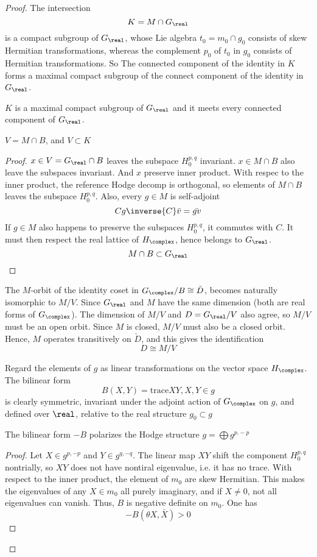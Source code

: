 \documentclass{article}
\begin{document}
\begin{proof}
The intersection
\[
    K = M \cap G_{\real}
\]
is a compact subgroup of $G_{\real}$, whose Lie algebra $t_0 = m_0\cap g_0$ consists 
of skew Hermitian transformations, whereas the complement $p_0$ of $t_0$ in $g_0$ 
consists of Hermitian transformations. So The connected component of the identity 
in $K$ forms a maximal compact subgroup of the connect component  of the identity in
$G_{\real}$. 

$K$ is a maximal compact subgroup of $G_{\real}$ and it meets every connected 
component of $G_{\real}$.

\begin{lemma}
$V = M \cap B$, and $V \subset K$
\end{lemma}
\begin{proof}
$x \in V = G_{\real}\cap B$ leaves the subspace $H_0^{p,q}$ invariant. $x \in M \cap B$
also leave the subspaces invariant. And $x$ preserve inner product. With respec to the 
inner product, the reference Hodge decomp is orthogonal, so elements of $M\cap B$ leaves
the subspace $H_0^{p,q}$. Also, every $g\in M$ is self-adjoint
\[
    Cg\inverse{C}\bar{v} = \bar{gv}
\]
If $g\in M$ also happens to preserve the subspaces $H_0^{p,q}$, it commutes with $C$.
It must then respect the real lattice of $H_{\complex}$, hence belongs to $G_{\real}$.
\[
    M\cap B \subset G_{\real}
\]
\end{proof}

The $M$-orbit of the identity coset in $G_{\complex}/B \cong \check{D}$, becomes 
naturally isomorphic to $M/V$. Since $G_{\real}$ and $M$ have the same dimension
(both are real forms of $G_{\complex}$). The dimension of $M/V$ and $D = G_{\real}/V$
also agree, so $M/V$ must be an open orbit. Since $M$ is closed, $M/V$ must also be a 
closed orbit. Hence, $M$ operates transitively on $\check{D}$, and this gives the 
identification
\[
    D \cong M/V
\]

Regard the elements of $g$ as linear transformations on the vector space $H_{\complex}$.
The bilinear form
\[
    B(X, Y) = \text{trace}XY, X,Y\in g
\]
is clearly symmetric, invariant under the adjoint action of $G_{\complex}$ on $g$,
and defined over $\real$, relative to the real structure $g_0 \subset g$

\begin{lemma}
The bilinear form $-B$ polarizes the Hodge structure $g = \bigoplus g^{p.-p}$
\end{lemma}
\begin{proof}
Let $X \in g^{p,-p}$ and $Y \in g^{q,-q}$. The linear map $XY$ shift the component
$H_0^{p,q}$ nontrially, so $XY$ does not have nontiral eigenvalue, i.e. it has no trace.
With respect to the inner product, the element of $m_0$ are skew Hermitian. This makes
the eigenvalues of any $X \in m_0$ all purely imaginary, and if $X \neq 0$, not all
eigenvalues can vanish. Thus, $B$ is negative definite on $m_0$. One has
\[
    -B(\theta X, \bar{X}) > 0
\]
\end{proof}


\end{proof}
\end{document}
